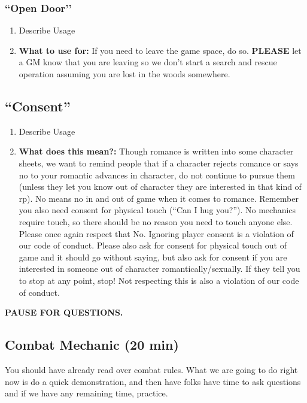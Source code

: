 \documentclass[green]{GL2020}
\begin{document}
\subsubsection*{``Open Door’’}	
	\begin{enumerate}
		\item Describe Usage
		\item \textbf{What to use for:} If you need to leave the game space, do so. \textbf{PLEASE} let a GM know that you are leaving so we don’t start a search and rescue operation assuming you are lost in the woods somewhere.
	\end{enumerate}

\subsection*{``Consent”}
	\begin{enumerate}
	\item Describe Usage
	\item \textbf{What does this mean?:} Though romance is written into some character sheets, we want to remind people that if a character rejects romance or says no to your romantic advances in character, do not continue to pursue them (unless they let you know out of character they are interested in that kind of rp). No means no in and out of game when it comes to romance. Remember you also need consent for physical touch (“Can I hug you?”). No mechanics require touch, so there should be no reason you need to touch anyone else. Please once again respect that No. Ignoring player consent is a violation of our code of conduct. Please also ask for consent for physical touch out of game and it should go without saying, but also ask for consent if you are interested in someone out of character romantically/sexually. If they tell you to stop at any point, stop!  Not respecting this is also a violation of our code of conduct.   
	\end{enumerate}

\textbf{PAUSE FOR QUESTIONS.}

\subsection*{Combat Mechanic (20 min)}

You should have already read over combat rules.  What we are going to do right now is do a quick demonstration, and then have folks have time to ask questions and if we have any remaining time, practice.
\end{document}
